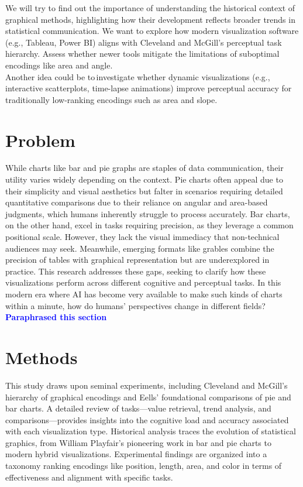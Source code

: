 \documentclass[
  10pt,
  letterpaper,
  twocolumn]{article}
\newcommand{\mt}[1]{{\textcolor{blue}{#1}}}
\begin{document}
We will try to find out the importance of understanding the historical
context of graphical methods, highlighting how their development
reflects broader trends in statistical communication. We want to explore
how modern visualization software (e.g., Tableau, Power BI) aligns with
Cleveland and McGill's perceptual task hierarchy. Assess whether newer
tools mitigate the limitations of suboptimal encodings like area and
angle.\\
Another idea could be to\,investigate whether dynamic visualizations
(e.g., interactive scatterplots, time-lapse animations) improve
perceptual accuracy for traditionally low-ranking encodings such as area
and slope.

\hypertarget{problem}{%
\section{Problem}\label{problem}}

While charts like bar and pie graphs are staples of data communication,
their utility varies widely depending on the context. Pie charts often
appeal due to their simplicity and visual aesthetics but falter in
scenarios requiring detailed quantitative comparisons due to their
reliance on angular and area-based judgments, which humans inherently
struggle to process accurately. Bar charts, on the other hand, excel in
tasks requiring precision, as they leverage a common positional scale.
However, they lack the visual immediacy that non-technical audiences may
seek. Meanwhile, emerging formats like grables combine the precision of
tables with graphical representation but are underexplored in practice.
This research addresses these gaps, seeking to clarify how these
visualizations perform across different cognitive and perceptual tasks.
In this modern era where AI has become very available to make such kinds
of charts within a minute, how do humans' perspectives change in
different fields? \mt{\textbf{Paraphrased this section}}

\hypertarget{methods}{%
\section{Methods}\label{methods}}

This study draws upon seminal experiments, including Cleveland and
McGill's hierarchy of graphical encodings and Eells' foundational
comparisons of pie and bar charts. A detailed review of tasks---value
retrieval, trend analysis, and comparisons---provides insights into the
cognitive load and accuracy associated with each visualization type.
Historical analysis traces the evolution of statistical graphics, from
William Playfair's pioneering work in bar and pie charts to modern
hybrid visualizations. Experimental findings are organized into a
taxonomy ranking encodings like position, length, area, and color in
terms of effectiveness and alignment with specific tasks.
\end{document}
